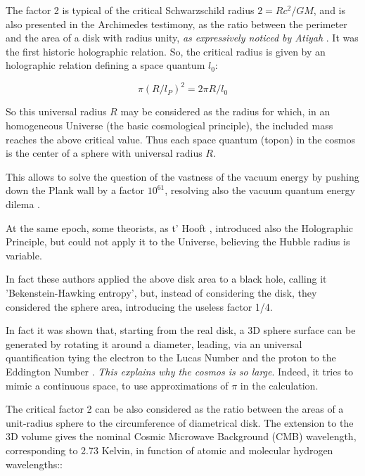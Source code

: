 \documentclass[a4paper,9pt]{article}
\begin{document}
 
    The factor 2 is typical of the critical Schwarzschild radius $2 = Rc^2/GM$, and is also presented in the Archimedes testimony, as the ratio between the perimeter and the area of a disk with radius unity, \textit {as expressively noticed by Atiyah }. It was the first historic holographic relation. So, the critical radius is given by an holographic relation defining a space quantum $l_0$:
    
    \begin{equation}
        \pi (R/l_P)^2 = 2\pi R/l_0
    \end{equation}
    
    So this universal radius $R$ may be considered as the radius for which, in an homogeneous Universe (the basic cosmological principle), the included mass reaches the above critical value\cite{Sanchez}. Thus each space quantum (topon) in the cosmos is the center of a sphere with universal radius $R$.  
    
    
    This allows to solve the question of the vastness of the vacuum energy by pushing down the Plank wall by a factor $10^61$, resolving also the vacuum quantum energy dilema  \cite{Sanchez} . 
    
    
    At the same epoch, some theorists, as t' Hooft \cite{Hooft}, introduced also the Holographic Principle, but could not apply it to the Universe, believing the Hubble radius is variable.
    
    
    In fact these authors applied the above disk area to a black hole, calling it 'Bekenstein-Hawking entropy'\cite{Bekenstein}, but, instead of considering the disk, they considered the sphere area, introducing the useless factor 1/4. 
    
    
    In fact it was shown that, starting from the real disk, a 3D sphere surface can be generated by rotating it around a diameter, leading, via an universal quantification tying the electron to the Lucas Number and the proton to the Eddington Number \cite{Sanchez}. \textit {This explains why the cosmos is so large}. Indeed, it tries to mimic a continuous space, to use approximations of $\pi$ in  the calculation.
    
    
    The critical factor 2 can be also considered as the ratio between the areas of a unit-radius sphere to the circumference of diametrical disk. The extension to the 3D volume gives the nominal Cosmic Microwave Background (CMB) wavelength, corresponding to 2.73 Kelvin, in function of atomic and molecular hydrogen wavelengths:\cite{Sanchez}:
    
\end{document}
